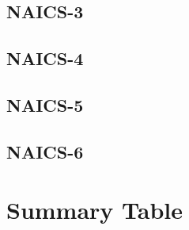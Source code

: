 \documentclass{article}
\begin{document}
\subsection*{NAICS-3}





\subsection*{NAICS-4}





\subsection*{NAICS-5}





\subsection*{NAICS-6}





\clearpage
\section*{Summary Table}

\end{document}
